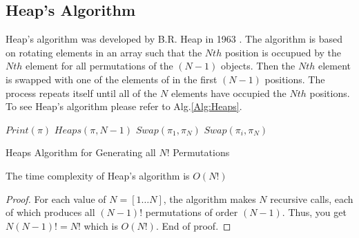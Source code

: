 \subsection{Heap's Algorithm}
Heap's algorithm was developed by B.R. Heap in 1963 \cite{A24}. 
The algorithm is based on rotating elements in an array such that the $Nth$ position 
is occupued by the $Nth$ element for all permutations of the $(N-1)$ objects. 
Then the $Nth$ element is swapped with one of the elements of in the first $(N-1)$ positions.
The process repeats itself until all of the $N$ elements have occupied the $Nth$ positions. 
To see Heap's algorithm please refer to Alg.\ref{Alg:Heaps}.

\begin{algorithm}
    \begin{algorithmic}[1]
                \State $Print(\pi)$
            \Else 
                    \State $Heaps(\pi, N-1)$
                        \State $Swap(\pi_{1}, \pi_{N})$
                    \Else 
                        \State $Swap(\pi_{i}, \pi_{N})$
                    \EndIf
                \EndFor
            \EndIf
        \EndFunction
        
    \end{algorithmic}
    \caption{Heaps Algorithm for Generating all $N!$ Permutations}
    \label{Alg:Heaps}
\end{algorithm}

\begin{lemma}
    The time complexity of Heap's algorithm is $O(N!)$
\end{lemma}
\begin{proof}
    For each value of $N=[1 \dots N]$, the algorithm makes $N$ recursive calls, each of which produces all $(N-1)!$ permutations of 
    order $(N-1)$. Thus, you get $N(N-1)!=N!$ which is $O(N!)$. End of proof.
\end{proof}

